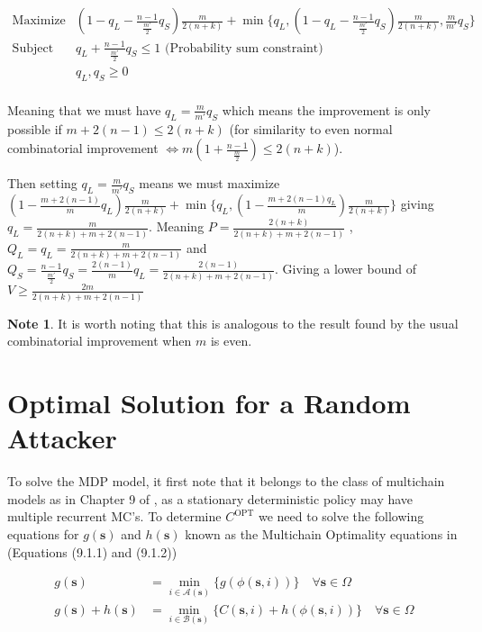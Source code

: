 \documentclass[a4paper,10pt]{article}
\theoremstyle{definition}
\theoremstyle{definition}
\theoremstyle{remark}
\theoremstyle{definition}
\newtheorem*{note}{Note}
\begin{document}
$$\begin{array}{cc}
\text{Maximize} & (1-q_{L}-\frac{n-1}{ \frac{m'}{2}}q_{S}) \frac{m}{2(n+k)} + \min \{ q_{L}, (1-q_{L}-\frac{n-1}{\frac{m'}{2}}q_{S}) \frac{m}{2(n+k)} , \frac{m}{m'}q_{S} \}\\
\text{Subject to } & q_{L}+\frac{n-1}{\frac{m'}{2}}q_{S} \leq 1 \text{  (Probability sum constraint)} \\
     & q_{L},q_{S} \geq 0 \\
\end{array} $$

Meaning that we must have $q_{L}=\frac{m}{m'}q_{S}$ which means the improvement is only possible if $m+2(n-1) \leq 2(n+k)$ (for similarity to even normal combinatorial improvement $\iff m(1+\frac{n-1}{\frac{m}{2}}) \leq 2(n+k)$). 

Then setting $q_{L}=\frac{m}{m'}q_{S}$ means we must maximize $(1-\frac{m+2(n-1)}{m}q_{L})\frac{m}{2(n+k)}+\min\{ q_{L}, (1-\frac{m+2(n-1)q_{L}}{m})\frac{m}{2(n+k)} \}$ giving $q_{L}=\frac{m}{2(n+k)+m+2(n-1)}$. Meaning $P=\frac{2(n+k)}{2(n+k)+m+2(n-1)}$ , $Q_{L}=q_{L}=\frac{m}{2(n+k)+m+2(n-1)}$ and $Q_{S}=\frac{n-1}{\frac{m'}{2}}q_{S}=\frac{2(n-1)}{m}q_{L}=\frac{2(n-1)}{2(n+k)+m+2(n-1)}$. Giving a lower bound of $V \geq \frac{2m}{2(n+k)+m+2(n-1)}$

\begin{note}
It is worth noting that this is analogous to the result found by the usual combinatorial improvement when $m$ is even.
\end{note}



\section{Optimal Solution for a Random Attacker}
\label{Appendix:Optimal Solution for a Random Attacker}
To solve the MDP model, it first note that it belongs to the class of multichain models as in Chapter 9 of \cite{Puterman1994}, as a stationary deterministic policy may have multiple recurrent MC's. To determine $C^{\text{OPT}}$ we need to solve the following equations for $g(\bm{s})$ and $h(\bm{s})$ known as the Multichain Optimality equations in \cite{Puterman1994} (Equations (9.1.1) and (9.1.2))

\begin{align*}
g(\bm{s}) &= \min\limits_{i \in \mathcal{A}(\bm{s})} \{g(\phi(\bm{s},i)) \} \quad \forall \bm{s} \in \Omega \\
g(\bm{s})+h(\bm{s}) &= \min\limits_{i \in \mathcal{B}(\bm{s})} \{C(\bm{s},i)+h(\phi(\bm{s},i)) \} \quad \forall \bm{s} \in \Omega
\end{align*}
\end{document}
